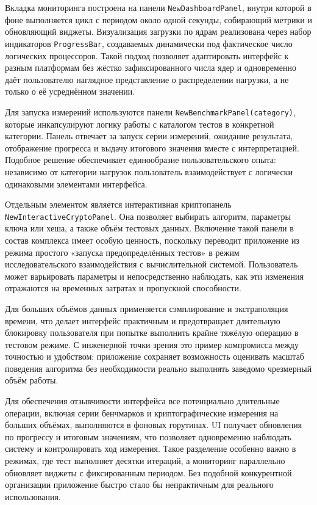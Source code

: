 Вкладка мониторинга построена на панели \texttt{NewDashboardPanel}, внутри которой в фоне выполняется цикл с периодом около одной секунды, собирающий метрики и обновляющий виджеты. Визуализация загрузки по ядрам реализована через набор индикаторов \texttt{ProgressBar}, создаваемых динамически под фактическое число логических процессоров. Такой подход позволяет адаптировать интерфейс к разным платформам без жёстко зафиксированного числа ядер и одновременно даёт пользователю наглядное представление о распределении нагрузки, а не только о её усреднённом значении.

Для запуска измерений используются панели \texttt{NewBenchmarkPanel(category)}, которые инкапсулируют логику работы с каталогом тестов в конкретной категории. Панель отвечает за запуск серии измерений, ожидание результата, отображение прогресса и выдачу итогового значения вместе с интерпретацией. Подобное решение обеспечивает единообразие пользовательского опыта: независимо от категории нагрузок пользователь взаимодействует с логически одинаковыми элементами интерфейса.

Отдельным элементом является интерактивная криптопанель \texttt{NewInteractiveCryptoPanel}. Она позволяет выбирать алгоритм, параметры ключа или хеша, а также объём тестовых данных. Включение такой панели в состав комплекса имеет особую ценность, поскольку переводит приложение из режима простого «запуска предопределённых тестов» в режим исследовательского взаимодействия с вычислительной системой. Пользователь может варьировать параметры и непосредственно наблюдать, как эти изменения отражаются на временных затратах и пропускной способности.

Для больших объёмов данных применяется сэмплирование и экстраполяция времени, что делает интерфейс практичным и предотвращает длительную блокировку пользователя при попытке выполнить крайне тяжёлую операцию в тестовом режиме. С инженерной точки зрения это пример компромисса между точностью и удобством: приложение сохраняет возможность оценивать масштаб поведения алгоритма без необходимости реально выполнять заведомо чрезмерный объём работы.

Для обеспечения отзывчивости интерфейса все потенциально длительные операции, включая серии бенчмарков и криптографические измерения на больших объёмах, выполняются в фоновых горутинах. UI получает обновления по прогрессу и итоговым значениям, что позволяет одновременно наблюдать систему и контролировать ход измерения. Такое разделение особенно важно в режимах, где тест выполняет десятки итераций, а мониторинг параллельно обновляет виджеты с фиксированным периодом. Без подобной конкурентной организации приложение быстро стало бы непрактичным для реального использования.

